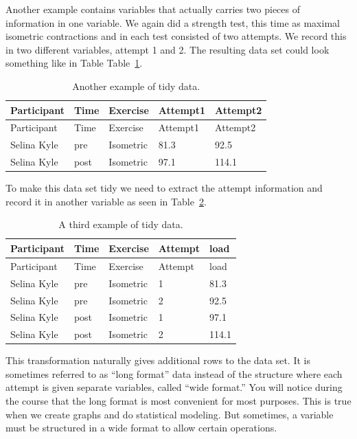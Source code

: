 \documentclass[
  11pt,
  letterpaper,
]{scrbook}
\begin{document}
Another example contains variables that actually carries two pieces of
information in one variable. We again did a strength test, this time as
maximal isometric contractions and in each test consisted of two
attempts. We record this in two different variables, attempt 1 and 2.
The resulting data set could look something like in Table
Table~\ref{tbl-tidydata2}.

\hypertarget{tbl-tidydata2}{}
\begin{longtable}[]{@{}lllll@{}}
\caption{\label{tbl-tidydata2}Another example of tidy
data.}\tabularnewline
\toprule\noalign{}
Participant & Time & Exercise & Attempt1 & Attempt2 \\
\midrule\noalign{}
\endfirsthead
\toprule\noalign{}
Participant & Time & Exercise & Attempt1 & Attempt2 \\
\midrule\noalign{}
\endhead
\bottomrule\noalign{}
\endlastfoot
Selina Kyle & pre & Isometric & 81.3 & 92.5 \\
Selina Kyle & post & Isometric & 97.1 & 114.1 \\
\end{longtable}

To make this data set tidy we need to extract the attempt information
and record it in another variable as seen in Table~\ref{tbl-tidydata3}.

\hypertarget{tbl-tidydata3}{}
\begin{longtable}[]{@{}lllll@{}}
\caption{\label{tbl-tidydata3}A third example of tidy
data.}\tabularnewline
\toprule\noalign{}
Participant & Time & Exercise & Attempt & load \\
\midrule\noalign{}
\endfirsthead
\toprule\noalign{}
Participant & Time & Exercise & Attempt & load \\
\midrule\noalign{}
\endhead
\bottomrule\noalign{}
\endlastfoot
Selina Kyle & pre & Isometric & 1 & 81.3 \\
Selina Kyle & pre & Isometric & 2 & 92.5 \\
Selina Kyle & post & Isometric & 1 & 97.1 \\
Selina Kyle & post & Isometric & 2 & 114.1 \\
\end{longtable}

This transformation naturally gives additional rows to the data set. It
is sometimes referred to as ``long format'' data instead of the
structure where each attempt is given separate variables, called ``wide
format.'' You will notice during the course that the long format is most
convenient for most purposes. This is true when we create graphs and do
statistical modeling. But sometimes, a variable must be structured in a
wide format to allow certain operations.
\end{document}
